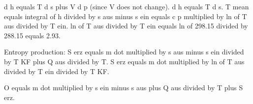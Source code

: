 d h equals T d s plus V d p (since V does not change).  
d h equals T d s.  
T mean equals integral of h divided by s aus minus s ein equals c p multiplied by ln of T aus divided by T ein.  
ln of T aus divided by T ein equals ln of 298.15 divided by 288.15 equals 2.93.  

Entropy production:  
S erz equals m dot multiplied by s aus minus s ein divided by T KF plus Q aus divided by T.  
S erz equals m dot multiplied by ln of T aus divided by T ein divided by T KF.  

O equals m dot multiplied by s ein minus s aus plus Q aus divided by T plus S erz.